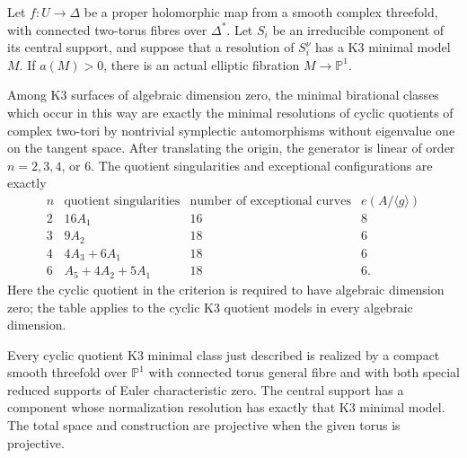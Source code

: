 
\begin{proposition}\label{cdp:st:C.2.UN.24}
Let $f:U\to\Delta$ be a proper holomorphic map from a
smooth complex threefold, with connected two-torus fibres
over $\Delta^*$. Let $S_i$ be an irreducible component of
its central support, and suppose that a resolution of
$S_i^\nu$ has a K3 minimal model $M$.
If $a(M)>0$, there is an actual elliptic fibration
$M\to\mathbb P^1$.

Among K3 surfaces of algebraic dimension zero, the minimal
birational classes which occur in this way are exactly the
minimal resolutions of cyclic quotients of complex two-tori
by nontrivial symplectic automorphisms without eigenvalue
one on the tangent space. After translating the origin, the generator
is linear of order $n=2,3,4$, or $6$. The quotient singularities
and exceptional configurations are exactly
\[
\begin{array}{c|c|c|c}
n&\text{quotient singularities}&
 \text{number of exceptional curves}&e(A/\langle g\rangle)\\ \hline
2&16A_1&16&8\\
3&9A_2&18&6\\
4&4A_3+6A_1&18&6\\
6&A_5+4A_2+5A_1&18&6.
\end{array}                                                    \tag{C.K3.1}\label{cdp:eq:C.K3.1}
\]
Here the cyclic quotient in the criterion is required to
have algebraic dimension zero; the table applies to the
cyclic K3 quotient models in every algebraic dimension.

Every cyclic quotient K3 minimal class just described is
realized by a compact smooth threefold over $\mathbb P^1$
with connected torus general fibre and with both special
reduced supports of Euler characteristic zero. The central
support has a component whose normalization resolution has
exactly that K3 minimal model. The total space and construction
are projective when the given torus is projective.
\end{proposition}

